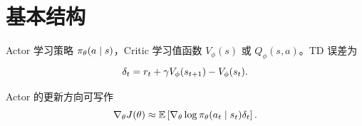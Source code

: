 \section{基本结构}

Actor 学习策略 $\pi_{\theta}(a\mid s)$，Critic 学习值函数 $V_{\phi}(s)$ 或 $Q_{\phi}(s,a)$。TD 误差为
\[
  \delta_t=r_t+\gamma V_{\phi}(s_{t+1})-V_{\phi}(s_t).
\]

Actor 的更新方向可写作
\[
  \nabla_{\theta}J(\theta)
  \approx
  \mathbb{E}\left[
    \nabla_{\theta}\log\pi_{\theta}(a_t\mid s_t)\delta_t
  \right].
\]
